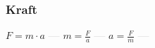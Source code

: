 \subsubsection{Kraft} 
\begin{minipage}{0.45\textwidth} 
\end{minipage} 
\begin{minipage}{0.45\textwidth} 
 
\end{minipage} 
$ F = m\cdot a $ \textcolor{lightgray}{\textbf{---}} 
$ m = \frac{F}{a} $ \textcolor{lightgray}{\textbf{---}} 
$ a = \frac{F}{m} $ \textcolor{lightgray}{\textbf{---}} 

